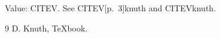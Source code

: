 \documentclass{article}
\begin{document}
\def\cite{CITEV}
Value: \cite. See \cite[p.~3]{knuth} and \cite{knuth}.
\begin{thebibliography}{9} D. Knuth, TeXbook.\end{thebibliography}
\end{document}
